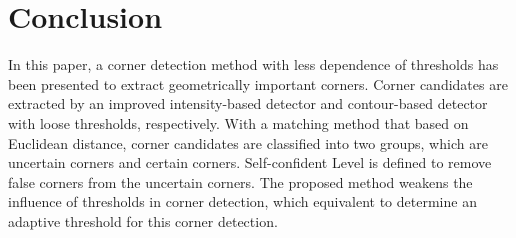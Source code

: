 \documentclass[letterpaper, 10 pt, conference]{ieeeconf}  %
\begin{document}
\section{Conclusion}
In this paper, a corner detection method with less dependence of thresholds has been presented to extract geometrically important corners. Corner candidates are extracted by an improved intensity-based detector and contour-based detector with loose thresholds, respectively. With a matching method that based on Euclidean distance, corner candidates are classified into two groups, which are uncertain corners and certain corners. Self-confident Level is defined to remove false corners from the uncertain corners. The proposed method weakens the influence of thresholds in corner detection, which equivalent to determine an adaptive threshold for this corner detection.









\addtolength{\textheight}{-12cm}   %
\end{document}
